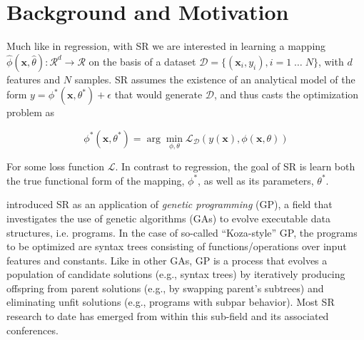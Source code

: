 
\section{Background and Motivation}

Much like in regression, with SR we are interested in learning a mapping $\hat{\phi}(\mathbf{x}, \hat{\theta}): \mathcal{R}^d \rightarrow \mathcal{R}$ on the basis of a dataset  $\mathcal{D} = \{(\mathbf{x}_i, y_i), i = 1\;\dots\;N\}$, with $d$ features and $N$ samples. 
SR assumes the existence of an analytical model of the form $y = \phi^*(\mathbf{x},\theta^*) + \epsilon$ that would generate $\mathcal{D}$, and thus casts the optimization problem as 

\begin{equation}
    \phi^*(\mathbf{x},\theta^*) = \arg \min_{\phi,\theta} \mathcal{L}_{\mathcal{D}}\left(y(\mathbf{x}), \phi(\mathbf{x}, \theta) \right)
\end{equation}

For some loss function $\mathcal{L}$. 
In contrast to regression, the goal of SR is learn both the true functional form of the mapping, $\phi^*$, as well as its parameters, $\theta^*$. 

\citet{kozaGeneticProgrammingProgramming1992a} introduced SR as an application of \textit{genetic programming} (GP), a field that investigates the use of genetic algorithms (GAs) to evolve executable data structures, i.e. programs. 
In the case of so-called ``Koza-style'' GP, the programs to be optimized are syntax trees consisting of functions/operations over input features and constants. 
Like in other GAs, GP is a process that evolves a population of candidate solutions (e.g., syntax trees) by iteratively producing offspring from parent solutions (e.g., by swapping parent's subtrees) and eliminating unfit solutions (e.g., programs with subpar behavior).
Most SR research to date has emerged from within this sub-field and its associated conferences.


